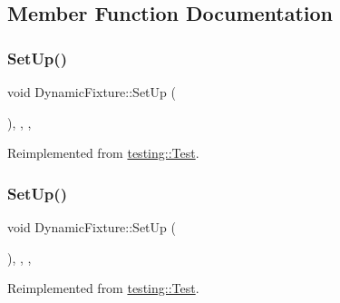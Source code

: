 \subsection{Member Function Documentation}
\mbox{\label{class_dynamic_fixture_a1439886d8a6972815b60a216d731a115}} 
\subsubsection{\texorpdfstring{SetUp()}{SetUp()}\hspace{0.1cm}{\footnotesize\ttfamily [1/2]}}
{\footnotesize\ttfamily void Dynamic\+Fixture\+::\+Set\+Up (\begin{DoxyParamCaption}{ }\end{DoxyParamCaption})\hspace{0.3cm}{\ttfamily [inline]}, {\ttfamily [override]}, {\ttfamily [protected]}, {\ttfamily [virtual]}}



Reimplemented from \mbox{\hyperlink{classtesting_1_1_test_a190315150c303ddf801313fd1a777733}{testing\+::\+Test}}.

\mbox{\label{class_dynamic_fixture_a1439886d8a6972815b60a216d731a115}} 
\subsubsection{\texorpdfstring{SetUp()}{SetUp()}\hspace{0.1cm}{\footnotesize\ttfamily [2/2]}}
{\footnotesize\ttfamily void Dynamic\+Fixture\+::\+Set\+Up (\begin{DoxyParamCaption}{ }\end{DoxyParamCaption})\hspace{0.3cm}{\ttfamily [inline]}, {\ttfamily [override]}, {\ttfamily [protected]}, {\ttfamily [virtual]}}



Reimplemented from \mbox{\hyperlink{classtesting_1_1_test_a190315150c303ddf801313fd1a777733}{testing\+::\+Test}}.

\mbox{\label{class_dynamic_fixture_ae6e3117ba3fcc3108ac094d96ea441d6}} 
